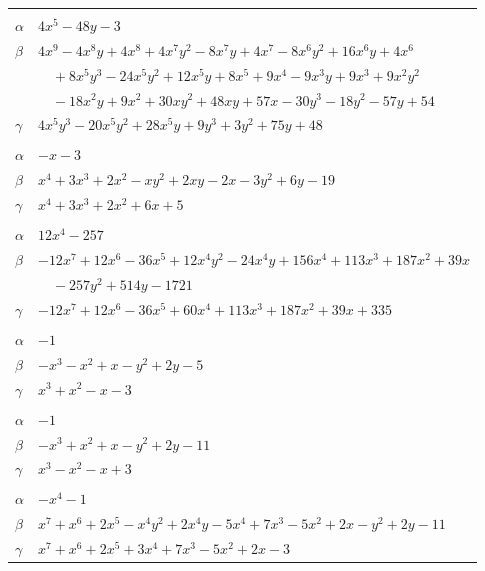 \documentclass[11pt]{article}
\begin{document}
\begin{longtable}{@{}ll@{}}
\addlinespace[3pt]
\multicolumn{2}{@{}l}{$\{i,j\}=\{8,42\}$, $k_{ij}=3^{2}\cdot 11$}\\
$\alpha$ & $4x^{5}-48y-3$\\
$\beta$ & $4x^{9}-4x^{8}y+4x^{8}+4x^{7}y^{2}-8x^{7}y+4x^{7}-8x^{6}y^{2}+16x^{6}y+4x^{6}$\\
 & $\quad +8x^{5}y^{3}-24x^{5}y^{2}+12x^{5}y+8x^{5}+9x^{4}-9x^{3}y+9x^{3}+9x^{2}y^{2}$\\
 & $\quad -18x^{2}y+9x^{2}+30xy^{2}+48xy+57x-30y^{3}-18y^{2}-57y+54$\\
$\gamma$ & $4x^{5}y^{3}-20x^{5}y^{2}+28x^{5}y+9y^{3}+3y^{2}+75y+48$\\
\addlinespace[3pt]
\multicolumn{2}{@{}l}{$\{i,j\}=\{9,20\}$, $k_{ij}=5\cdot 7$}\\
$\alpha$ & $-x-3$\\
$\beta$ & $x^{4}+3x^{3}+2x^{2}-xy^{2}+2xy-2x-3y^{2}+6y-19$\\
$\gamma$ & $x^{4}+3x^{3}+2x^{2}+6x+5$\\
\addlinespace[3pt]
\multicolumn{2}{@{}l}{$\{i,j\}=\{9,23\}$, $k_{ij}=5\cdot 7^{2}\cdot 13$}\\
$\alpha$ & $12x^{4}-257$\\
$\beta$ & $-12x^{7}+12x^{6}-36x^{5}+12x^{4}y^{2}-24x^{4}y+156x^{4}+113x^{3}+187x^{2}+39x$\\
 & $\quad -257y^{2}+514y-1721$\\
$\gamma$ & $-12x^{7}+12x^{6}-36x^{5}+60x^{4}+113x^{3}+187x^{2}+39x+335$\\
\addlinespace[3pt]
\multicolumn{2}{@{}l}{$\{i,j\}=\{9,24\}$, $k_{ij}=3^{2}$}\\
$\alpha$ & $-1$\\
$\beta$ & $-x^{3}-x^{2}+x-y^{2}+2y-5$\\
$\gamma$ & $x^{3}+x^{2}-x-3$\\
\addlinespace[3pt]
\multicolumn{2}{@{}l}{$\{i,j\}=\{9,27\}$, $k_{ij}=3\cdot 7$}\\
$\alpha$ & $-1$\\
$\beta$ & $-x^{3}+x^{2}+x-y^{2}+2y-11$\\
$\gamma$ & $x^{3}-x^{2}-x+3$\\
\addlinespace[3pt]
\multicolumn{2}{@{}l}{$\{i,j\}=\{9,30\}$, $k_{ij}=2\cdot 3^{2}$}\\
$\alpha$ & $-x^{4}-1$\\
$\beta$ & $x^{7}+x^{6}+2x^{5}-x^{4}y^{2}+2x^{4}y-5x^{4}+7x^{3}-5x^{2}+2x-y^{2}+2y-11$\\
$\gamma$ & $x^{7}+x^{6}+2x^{5}+3x^{4}+7x^{3}-5x^{2}+2x-3$\\

\end{longtable}
\end{document}

